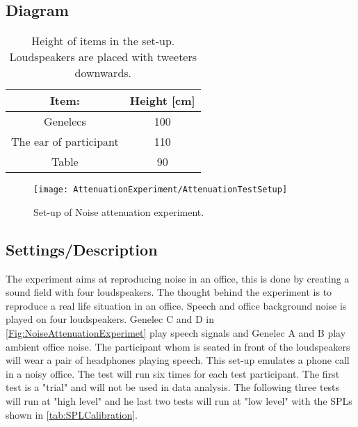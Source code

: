 \subsection{Diagram}

\begin{table} [h]
	\centering
	\begin{tabular}{c c} \toprule
		\centering
		 Item:			 			& Height [cm] 	\\ \bottomrule
		Genelecs					  	& 100				\\
		The ear of participant			& 110				\\ 
		Table							& 90				\\ \bottomrule 
	\end{tabular}
	\caption{Height of items in the set-up. Loudspeakers are placed with tweeters downwards.}
	\label{Tab:NoiseAttenuationDimensions}
\end{table}


\begin{figure}[H]
	\centering
%	
	\texttt{[image: AttenuationExperiment/AttenuationTestSetup]}
	\caption{Set-up of Noise attenuation experiment.}
	\label{Fig:NoiseAttenuationExperimet}
\end{figure}


\subsection{Settings/Description}
The experiment aims at reproducing noise in an office, this is done by creating a sound field with four loudspeakers. 
The thought behind the experiment is to reproduce a real life situation in an office. Speech and office background noise is played on four loudspeakers. Genelec C and D in \autoref{Fig:NoiseAttenuationExperimet} play speech signals and Genelec A and B play ambient office noise. The participant whom is seated in front of the loudspeakers will wear a pair of headphones playing speech. This set-up emulates a phone call in a noisy office. The test will run six times for each test participant. The first test is a "trial" and will not be used in data analysis. The following three tests will run at "high level" and he last two tests will run at "low level" with the SPLs shown in \autoref{tab:SPLCalibration}. 


